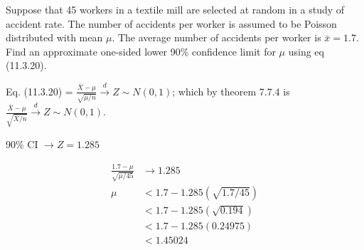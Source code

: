 \documentclass[answers]{exam}
\begin{document}
\begin{questions}
\question 
Suppose that 45 workers in a textile mill are selected at random in a study of accident rate. 
The number of accidents per worker is assumed to be Poisson distributed with mean \(\mu\). 
The average number of accidents per worker is \(\bar{x}=1.7\).
Find an approximate one-sided lower 90\% confidence limit for \(\mu\) 
using eq (11.3.20).
\begin{solution}
	Eq. (11.3.20) = \(\frac{\bar{X}-\mu}{\sqrt{\mu/n}}\overset{d}{\rightarrow} Z\sim N(0,1)\); 
	which by theorem 7.7.4 is 
	\(\frac{\bar{X}-\mu}{\sqrt{\bar{X}/n}}\overset{d}{\rightarrow} Z\sim N(0,1)\).
	
	90\% CI $\rightarrow Z = 1.285$ 
	
	\begin{align*}
		\frac{1.7-\mu}{\sqrt{\mu/45}} &\rightarrow 1.285 \\
		\mu &< 1.7-1.285(\sqrt{1.7/45}) \\
		&< 1.7-1.285(\sqrt{0.194}) \\
		&< 1.7-1.285(0.24975) \\
		&< 1.45024
	\end{align*}
\end{solution}


\end{questions}
\end{document}
